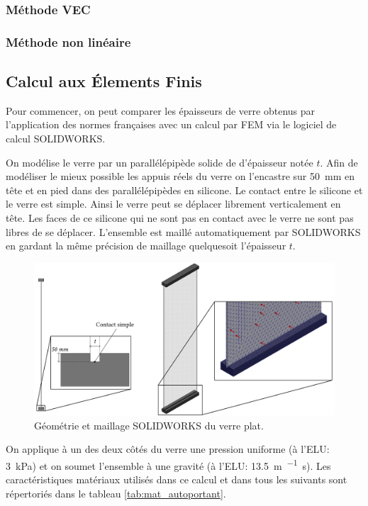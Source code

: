 \documentclass[11pt,titlepage]{article}
\begin{document}
\subsubsection{Méthode VEC}
\subsubsection{Méthode non linéaire}

\subsection{Calcul aux Élements Finis}\label{sec:temoin}

Pour commencer, on peut comparer les épaisseurs de verre obtenus par l'application des normes françaises avec un calcul par \acrfull{FEM} via le logiciel de calcul SOLIDWORKS.

On modélise le verre par un parallélépipède solide de  d'épaisseur notée $t$. Afin de modéliser le mieux possible les appuis réels du verre on l'encastre sur \qty{50}{\milli\metre} en tête et en pied dans des parallélépipèdes en silicone. Le contact entre le silicone et le verre est simple. Ainsi le verre peut se déplacer librement verticalement en tête. Les faces de ce silicone qui ne sont pas en contact avec le verre ne sont pas libres de se déplacer. L'ensemble est maillé automatiquement par SOLIDWORKS en gardant la même précision de maillage quelquesoit l'épaisseur $t$. 

\begin{figure}[H]
    \centering
    \includegraphics[width=\textwidth]{img/plat/fem.pdf}
    \caption{Géométrie et maillage SOLIDWORKS du verre plat.}
    \label{fig:fem_plat}
\end{figure}

On applique à un des deux côtés du verre une pression uniforme (à l'\acrshort{ELU}: \qty{3}{\kilo\pascal}) et on soumet l'ensemble à une gravité (à l'\acrshort{ELU}: \qty{13.5}{\metre\per\squared\second}). Les caractéristiques matériaux utilisés dans ce calcul et dans tous les suivants sont répertoriés dans le tableau \ref{tab:mat_autoportant}. 
\end{document}
